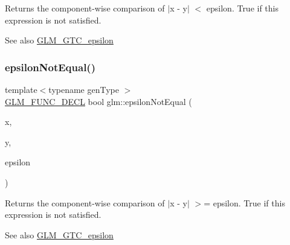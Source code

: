 Returns the component-\/wise comparison of $\vert$x -\/ y$\vert$ $<$ epsilon. True if this expression is not satisfied.

\begin{DoxySeeAlso}{See also}
\mbox{\hyperlink{group__gtc__epsilon}{G\+L\+M\+\_\+\+G\+T\+C\+\_\+epsilon}} 
\end{DoxySeeAlso}
\mbox{\label{group__gtc__epsilon_ga50a92103fb0cbd796908e1bf20c79aaf}} 
\subsubsection{\texorpdfstring{epsilonNotEqual()}{epsilonNotEqual()}\hspace{0.1cm}{\footnotesize\ttfamily [2/2]}}
{\footnotesize\ttfamily template$<$typename gen\+Type $>$ \\
\mbox{\hyperlink{setup_8hpp_ab2d052de21a70539923e9bcbf6e83a51}{G\+L\+M\+\_\+\+F\+U\+N\+C\+\_\+\+D\+E\+CL}} bool glm\+::epsilon\+Not\+Equal (\begin{DoxyParamCaption}\item[{gen\+Type const \&}]{x,  }\item[{gen\+Type const \&}]{y,  }\item[{gen\+Type const \&}]{epsilon }\end{DoxyParamCaption})}

Returns the component-\/wise comparison of $\vert$x -\/ y$\vert$ $>$= epsilon. True if this expression is not satisfied.

\begin{DoxySeeAlso}{See also}
\mbox{\hyperlink{group__gtc__epsilon}{G\+L\+M\+\_\+\+G\+T\+C\+\_\+epsilon}} 
\end{DoxySeeAlso}
